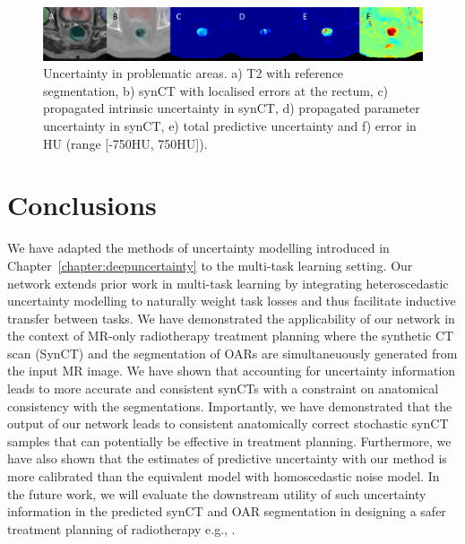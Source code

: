 \begin{figure}[!t]
	\centering
	\includegraphics[width=\linewidth]{chapter_5/figures/new_qa.pdf}
	\caption{Uncertainty in problematic areas. a) T2 with reference segmentation, b) synCT with localised errors at the rectum, c) propagated intrinsic uncertainty in synCT, d) propagated parameter uncertainty in synCT, e) total predictive uncertainty and f) error in HU (range [-750HU, 750HU]).} 
	\label{fig:diagram4}
\end{figure}

\section{Conclusions}
%
%
We have adapted the methods of uncertainty modelling introduced in Chapter~\ref{chapter:deepuncertainty} to the multi-task learning setting. Our network extends prior work in multi-task learning by integrating heteroscedastic uncertainty modelling to naturally weight task losses and thus facilitate inductive transfer between tasks. We have demonstrated the applicability of our network in the context of MR-only radiotherapy treatment planning where the synthetic CT scan (SynCT) and the segmentation of OARs are simultaneuously generated from the input MR image. We have shown that accounting for uncertainty information leads to more accurate and consistent synCTs with a constraint on anatomical consistency with the segmentations. Importantly, we have demonstrated that the output of our network leads to consistent anatomically correct stochastic synCT samples that can potentially be effective in treatment planning. Furthermore, we have also shown that the estimates of predictive uncertainty with our method is more calibrated than the equivalent model with homoscedastic noise model. In the future work, we will evaluate the downstream utility of such uncertainty information in the predicted synCT and OAR segmentation in designing a safer treatment planning of radiotherapy e.g., \cite{sands2015utilisation,tilly2019probabilistic}.
 



